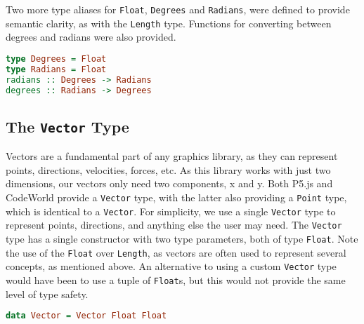 \documentclass[../main.tex]{subfiles}
\begin{document}
            Two more type aliases for \texttt{Float}, \texttt{Degrees} and
                \texttt{Radians}, were defined to provide semantic clarity, as with the
                \texttt{Length} type.
            Functions for converting between degrees and radians were also provided.

            \begin{lstlisting}[language={Haskell}, label={lst:angleFns}, caption={The angle functions.}]  
type Degrees = Float
type Radians = Float                
radians :: Degrees -> Radians
degrees :: Radians -> Degrees\end{lstlisting}

        \subsection{The \texttt{Vector}
            Type} Vectors are a fundamental part of any graphics library, as they can
                represent points, directions, velocities, forces, etc. As this library works
                with just two dimensions, our vectors only need two components, x and y.
            Both P5.js and CodeWorld provide a \texttt{Vector} type, with the latter also
                providing a \texttt{Point} type, which is identical to a \texttt{Vector}.
            For simplicity, we use a single \texttt{Vector} type to represent points,
                directions, and anything else the user may need.
            The \texttt{Vector} type has a single constructor with two type parameters,
                both of type \texttt{Float}.
            Note the use of the \texttt{Float} over \texttt{Length}, as vectors are often
                used to represent several concepts, as mentioned above.
            An alternative to using a custom \texttt{Vector} type would have been to use a
                tuple of \texttt{Float}s, but this would not provide the same level of type
                safety.

            \begin{lstlisting}[language={Haskell}, label={lst:vector}, caption={The \texttt{Vector} 
                type definition.}]
data Vector = Vector Float Float\end{lstlisting}
\end{document}

